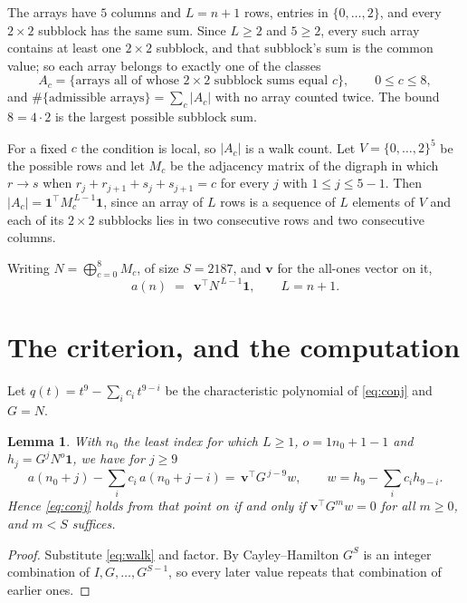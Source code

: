 \documentclass[11pt,a4paper]{article}
\theoremstyle{plain}
\newtheorem{lemma}[theorem]{Lemma}
\theoremstyle{definition}
\begin{document}
The arrays have $5$ columns and $L=n+1$ rows, entries in
$\{0,\dots,2\}$, and every $2\times2$ subblock has the same sum. Since $L\ge2$ and
$5\ge2$, every such array contains at least one $2\times2$ subblock, and that subblock's
sum is the common value; so each array belongs to exactly one of the classes
\[
A_c=\{\text{arrays all of whose }2\times2\text{ subblock sums equal }c\},
\qquad 0\le c\le 8,
\]
and $\#\{\text{admissible arrays}\}=\sum_c |A_c|$ with no array counted twice. The bound
$8=4\cdot2$ is the largest possible subblock sum.

For a fixed $c$ the condition is local, so $|A_c|$ is a walk count. Let
$V=\{0,\dots,2\}^{5}$ be the possible rows and let $M_c$ be the adjacency
matrix of the digraph in which $r\to s$ when
$r_j+r_{j+1}+s_j+s_{j+1}=c$ for every $j$ with $1\le j\le 5-1$. Then
$|A_c|=\mathbf{1}^{\!\top}M_c^{\,L-1}\mathbf{1}$, since an array of $L$ rows is a
sequence of $L$ elements of $V$ and each of its $2\times2$ subblocks lies in two consecutive
rows and two consecutive columns.

Writing $N=\bigoplus_{c=0}^{8}M_c$, of size $S=2187$, and $\mathbf{v}$ for the
all-ones vector on it,
\begin{equation}\label{eq:walk}
a(n)\;=\;\,\mathbf{v}^{\!\top}N^{\,L-1}\mathbf{1},\qquad L=n+1.
\end{equation}

\section{The criterion, and the computation}

Let $q(t)=t^{9}-\sum_i c_i\,t^{9-i}$ be the characteristic polynomial of
\eqref{eq:conj} and $G=N$.

\begin{lemma}\label{lem:crit}
With $n_0$ the least index for which $L\ge1$, $o=1n_0+1-1$ and
$h_j=G^{j}N^{o}\mathbf{1}$, we have for $j\ge9$
\[
a(n_0+j)-\sum_i c_i\,a(n_0+j-i)=\,\mathbf{v}^{\!\top}G^{\,j-9}w,
\qquad w=h_{9}-\sum_i c_ih_{9-i} .
\]
Hence \eqref{eq:conj} holds from that point on if and only if
$\mathbf{v}^{\!\top}G^{m}w=0$ for all $m\ge0$, and $m<S$ suffices.
\end{lemma}

\begin{proof}
Substitute \eqref{eq:walk} and factor. By Cayley--Hamilton $G^{S}$ is an integer
combination of $I,G,\dots,G^{S-1}$, so every later value repeats that combination of
earlier ones.
\end{proof}
\end{document}
